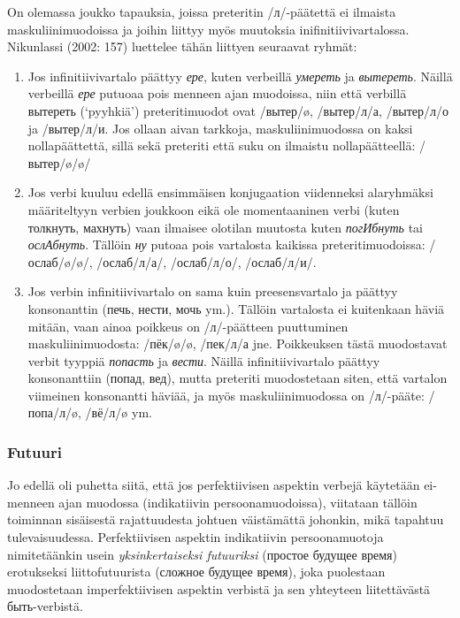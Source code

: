 \documentclass[]{scrartcl}
\providecommand{\tightlist}{%
  \setlength{\itemsep}{0pt}\setlength{\parskip}{0pt}}
\begin{document}
On olemassa joukko tapauksia, joissa preteritin /л/-päätettä ei ilmaista
maskuliinimuodoissa ja joihin liittyy myös muutoksia
inifinitiivivartalossa. Nikunlassi (2002: 157) luettelee tähän liittyen
seuraavat ryhmät:

\begin{enumerate}
\def\labelenumi{\arabic{enumi}.}
\tightlist
\item
  Jos infinitiivivartalo päättyy \emph{ере}, kuten verbeillä
  \emph{умереть} ja \emph{вытереть}. Näillä verbeillä \emph{ере} putuoaa
  pois menneen ajan muodoissa, niin että verbillä вытереть (`pyyhkiä')
  preteritimuodot ovat /вытер/ø, /вытер/л/а, /вытер/л/о ja /вытер/л/и.
  Jos ollaan aivan tarkkoja, maskuliinimuodossa on kaksi nollapäättettä,
  sillä sekä preteriti että suku on ilmaistu nollapäätteellä:
  /вытер/ø/ø/
\item
  Jos verbi kuuluu edellä ensimmäisen konjugaation viidenneksi
  alaryhmäksi määriteltyyn verbien joukkoon eikä ole momentaaninen verbi
  (kuten толкнуть, махнуть) vaan ilmaisee olotilan muutosta kuten
  \emph{погИбнуть} tai \emph{ослАбнуть}. Tällöin \emph{ну} putoaa pois
  vartalosta kaikissa preteritimuodoissa: /ослаб/ø/ø/, /ослаб/л/а/,
  /ослаб/л/о/, /ослаб/л/и/.
\item
  Jos verbin infinitiivivartalo on sama kuin preesensvartalo ja päättyy
  konsonanttin (печь, нести, мочь ym.). Tällöin vartalosta ei kuitenkaan
  häviä mitään, vaan ainoa poikkeus on /л/-päätteen puuttuminen
  maskuliinimuodosta: /пёк/ø/ø, /пек/л/а jne. Poikkeuksen tästä
  muodostavat verbit tyyppiä \emph{попасть} ja \emph{вести}. Näillä
  infinitiivivartalo päättyy konsonanttiin (попад, вед), mutta preteriti
  muodostetaan siten, että vartalon viimeinen konsonantti häviää, ja
  myös maskuliinimuodossa on /л/-pääte: /попа/л/ø, /вё/л/ø ym.
\end{enumerate}

\subsubsection{Futuuri}\label{futuuri}

Jo edellä oli puhetta siitä, että jos perfektiivisen aspektin verbejä
käytetään ei-menneen ajan muodossa (indikatiivin persoonamuodoissa),
viitataan tällöin toiminnan sisäisestä rajattuudesta johtuen väistämättä
johonkin, mikä tapahtuu tulevaisuudessa. Perfektiivisen aspektin
indikatiivin persoonamuotoja nimitetäänkin usein \emph{yksinkertaiseksi
futuuriksi} (простое будущее время) erotukseksi liittofutuurista
(сложное будущее время), joka puolestaan muodostetaan imperfektiivisen
aspektin verbistä ja sen yhteyteen liitettävästä быть-verbistä.
\end{document}
